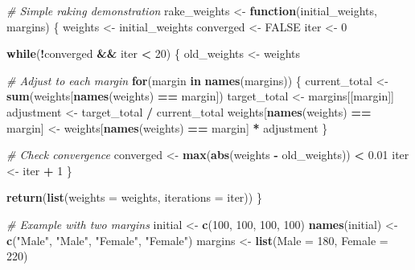 \documentclass[
]{article}
\newenvironment{Shaded}{\begin{snugshade}}{\end{snugshade}}
\newcommand{\AttributeTok}[1]{\textcolor[rgb]{0.13,0.29,0.53}{#1}}
\newcommand{\CommentTok}[1]{\textcolor[rgb]{0.56,0.35,0.01}{\textit{#1}}}
\newcommand{\ConstantTok}[1]{\textcolor[rgb]{0.56,0.35,0.01}{#1}}
\newcommand{\ControlFlowTok}[1]{\textcolor[rgb]{0.13,0.29,0.53}{\textbf{#1}}}
\newcommand{\DecValTok}[1]{\textcolor[rgb]{0.00,0.00,0.81}{#1}}
\newcommand{\FloatTok}[1]{\textcolor[rgb]{0.00,0.00,0.81}{#1}}
\newcommand{\FunctionTok}[1]{\textcolor[rgb]{0.13,0.29,0.53}{\textbf{#1}}}
\newcommand{\NormalTok}[1]{#1}
\newcommand{\OtherTok}[1]{\textcolor[rgb]{0.56,0.35,0.01}{#1}}
\newcommand{\SpecialCharTok}[1]{\textcolor[rgb]{0.81,0.36,0.00}{\textbf{#1}}}
\newcommand{\StringTok}[1]{\textcolor[rgb]{0.31,0.60,0.02}{#1}}
\begin{document}
\begin{Shaded}
\begin{Highlighting}[]
\CommentTok{\# Simple raking demonstration}
\NormalTok{rake\_weights }\OtherTok{\textless{}{-}} \ControlFlowTok{function}\NormalTok{(initial\_weights, margins) \{}
\NormalTok{  weights }\OtherTok{\textless{}{-}}\NormalTok{ initial\_weights}
\NormalTok{  converged }\OtherTok{\textless{}{-}} \ConstantTok{FALSE}
\NormalTok{  iter }\OtherTok{\textless{}{-}} \DecValTok{0}
  
  \ControlFlowTok{while}\NormalTok{(}\SpecialCharTok{!}\NormalTok{converged }\SpecialCharTok{\&\&}\NormalTok{ iter }\SpecialCharTok{\textless{}} \DecValTok{20}\NormalTok{) \{}
\NormalTok{    old\_weights }\OtherTok{\textless{}{-}}\NormalTok{ weights}
    
    \CommentTok{\# Adjust to each margin}
    \ControlFlowTok{for}\NormalTok{(margin }\ControlFlowTok{in} \FunctionTok{names}\NormalTok{(margins)) \{}
\NormalTok{      current\_total }\OtherTok{\textless{}{-}} \FunctionTok{sum}\NormalTok{(weights[}\FunctionTok{names}\NormalTok{(weights) }\SpecialCharTok{==}\NormalTok{ margin])}
\NormalTok{      target\_total }\OtherTok{\textless{}{-}}\NormalTok{ margins[[margin]]}
\NormalTok{      adjustment }\OtherTok{\textless{}{-}}\NormalTok{ target\_total }\SpecialCharTok{/}\NormalTok{ current\_total}
\NormalTok{      weights[}\FunctionTok{names}\NormalTok{(weights) }\SpecialCharTok{==}\NormalTok{ margin] }\OtherTok{\textless{}{-}}\NormalTok{ weights[}\FunctionTok{names}\NormalTok{(weights) }\SpecialCharTok{==}\NormalTok{ margin] }\SpecialCharTok{*}\NormalTok{ adjustment}
\NormalTok{    \}}
    
    \CommentTok{\# Check convergence}
\NormalTok{    converged }\OtherTok{\textless{}{-}} \FunctionTok{max}\NormalTok{(}\FunctionTok{abs}\NormalTok{(weights }\SpecialCharTok{{-}}\NormalTok{ old\_weights)) }\SpecialCharTok{\textless{}} \FloatTok{0.01}
\NormalTok{    iter }\OtherTok{\textless{}{-}}\NormalTok{ iter }\SpecialCharTok{+} \DecValTok{1}
\NormalTok{  \}}
  
  \FunctionTok{return}\NormalTok{(}\FunctionTok{list}\NormalTok{(}\AttributeTok{weights =}\NormalTok{ weights, }\AttributeTok{iterations =}\NormalTok{ iter))}
\NormalTok{\}}

\CommentTok{\# Example with two margins}
\NormalTok{initial }\OtherTok{\textless{}{-}} \FunctionTok{c}\NormalTok{(}\DecValTok{100}\NormalTok{, }\DecValTok{100}\NormalTok{, }\DecValTok{100}\NormalTok{, }\DecValTok{100}\NormalTok{)}
\FunctionTok{names}\NormalTok{(initial) }\OtherTok{\textless{}{-}} \FunctionTok{c}\NormalTok{(}\StringTok{"Male"}\NormalTok{, }\StringTok{"Male"}\NormalTok{, }\StringTok{"Female"}\NormalTok{, }\StringTok{"Female"}\NormalTok{)}
\NormalTok{margins }\OtherTok{\textless{}{-}} \FunctionTok{list}\NormalTok{(}\AttributeTok{Male =} \DecValTok{180}\NormalTok{, }\AttributeTok{Female =} \DecValTok{220}\NormalTok{)}


\end{Highlighting}
\end{Shaded}
\end{document}
